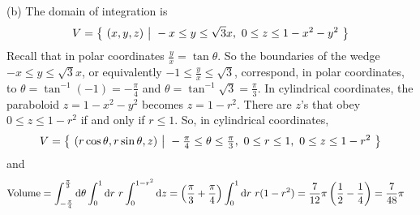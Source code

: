 \begin{solution}
(b) The domain of integration is
\begin{equation*}
V = \big\{ \ (x,y,z)\ \big|\ -x\le y\le \sqrt{3}x,\ 0\le z \le 1-x^2-y^2\ \big\}
\end{equation*}
Recall that in polar coordinates $\frac{y}{x}=\tan\theta$.
So the boundaries of the wedge $-x\le y\le \sqrt{3}x$, or equivalently
$-1\le\frac{y}{x}\le\sqrt{3}$, correspond, in polar coordinates, 
to $\theta=\tan^{-1}(-1)=-\frac{\pi}{4}$ and $\theta=\tan^{-1}\sqrt{3}=\frac{\pi}{3}$. In cylindrical coordinates,
the paraboloid $z=1-x^2-y^2$ becomes $z=1-r^2$. There are $z$'s that obey
$0\le z\le 1-r^2$ if and only if $r\le 1$. So, in cylindrical coordinates,
\begin{equation*}
V = \Set{(r\cos\theta,r\sin\theta,z)}
              {-\tfrac{\pi}{4}\le \theta\le \tfrac{\pi}{3},\ 
                  0\le r\le 1,\ 0\le z \le 1-r^2}
\end{equation*}
and
\begin{align*}
\text{Volume} 
&= \int_{-{\pi\over 4}}^{{\pi\over 3}} \dee{\theta}\int_0^1\dee{r}\ r
             \int_0^{1 -r^2}\dee{z}
= \left(\frac{\pi}{3}+\frac{\pi}{4}\right)\int_0^1\dee{r}\ r(1-r^2)
= \frac{7}{12}\pi\left(\frac{1}{2}-\frac{1}{4}\right)
= \frac{7}{48}\pi
\end{align*}


\end{solution}

